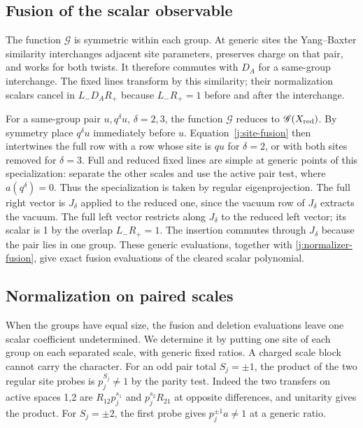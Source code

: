 \subsection{Fusion of the scalar observable}

The function $\mathscr G$ is symmetric within each group. At generic
sites the Yang--Baxter similarity interchanges adjacent site
parameters, preserves charge on that pair, and works for both twists.
It therefore commutes with $D_A$ for a same-group interchange.
The fixed lines transform by this similarity; their normalization
scalars cancel in $L_-D_A R_+$ because $L_-R_+=1$ before and after
the interchange.

For a same-group pair $u,q^\delta u$, $\delta=2,3$, the function
$\mathscr G$ reduces to $\mathscr G(X_{\rm red})$. By symmetry place
$q^\delta u$ immediately before $u$. Equation~\eqref{j:site-fusion}
then intertwines the full row with a row whose site is $qu$ for
$\delta=2$, or with both sites removed for $\delta=3$. Full and
reduced fixed lines are simple at generic points of this
specialization: separate the other scales and use the active pair
test, where $a(q^\delta)=0$. Thus the specialization is taken by
regular eigenprojection. The full right vector is $J_\delta$ applied
to the reduced one, since the vacuum row of $J_\delta$ extracts the
vacuum. The full left vector restricts along $J_\delta$ to the
reduced left vector; its scalar is 1 by the overlap $L_-R_+=1$.
The insertion commutes through $J_\delta$ because the pair lies in
one group. These generic evaluations, together with
\eqref{j:normalizer-fusion}, give exact fusion evaluations of the
cleared scalar polynomial.

\subsection{Normalization on paired scales}

When the groups have equal size, the fusion and deletion evaluations
leave one scalar coefficient undetermined. We determine it by putting
one site of each group on each separated scale, with generic fixed
ratios. A charged scale block cannot carry the character. For an odd
pair total $S_j=\pm1$, the product of the two regular site probes is
$p_j^{S_j}\ne1$ by the parity test. Indeed the two transfers on active
spaces 1,2 are $R_{12}p_j^{s_1}$ and $p_j^{s_2}R_{21}$ at opposite
differences, and unitarity gives the product. For $S_j=\pm2$, the
first probe gives $p_j^{\pm1}a\ne1$ at a generic ratio.

